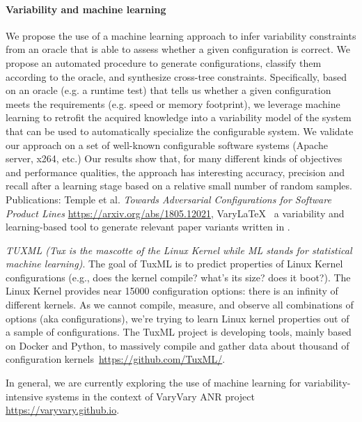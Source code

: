 \paragraph{Variability and machine learning}
We propose the use of a machine learning approach to infer variability constraints
from an oracle that is able to assess whether a given configuration is correct.
We propose an automated procedure to generate configurations, classify them according to the oracle, and synthesize cross-tree constraints. Specifically, based on an oracle (e.g. a runtime test) that tells us whether a given configuration meets the requirements (e.g. speed or memory footprint), we leverage machine learning to retrofit the acquired knowledge into a variability model of the system that can be used to automatically specialize the configurable system. We validate our approach on a set of well-known configurable software systems (Apache server, x264, etc.) 
Our results show that, for many different kinds of objectives and performance qualities, the approach has interesting accuracy, precision and recall after a learning stage based on a relative small number of random samples.
Publications: Temple et al. \emph{Towards Adversarial Configurations for Software Product Lines} \url{https://arxiv.org/abs/1805.12021}, VaryLaTeX~\cite{acher:hal-01659161} a variability and learning-based tool to generate relevant paper variants written in \latex. 

\emph{TUXML (Tux is the mascotte of the Linux Kernel while ML stands for statistical machine learning)}. The goal of TuxML  is to predict properties of Linux Kernel configurations (e.g., does the kernel compile? what's its size? does it boot?). The Linux Kernel provides near 15000 configuration options: there is an infinity of different kernels. As we cannot compile, measure, and observe all combinations of options (aka configurations), we're trying to learn Linux kernel properties out of a sample of configurations. The TuxML project is developing tools, mainly based on Docker and Python, to massively compile and gather data about thousand of configuration kernels~\url{https://github.com/TuxML/}.

In general, we are currently exploring the use of machine learning for variability-intensive systems in the context of VaryVary ANR project \url{https://varyvary.github.io}.




